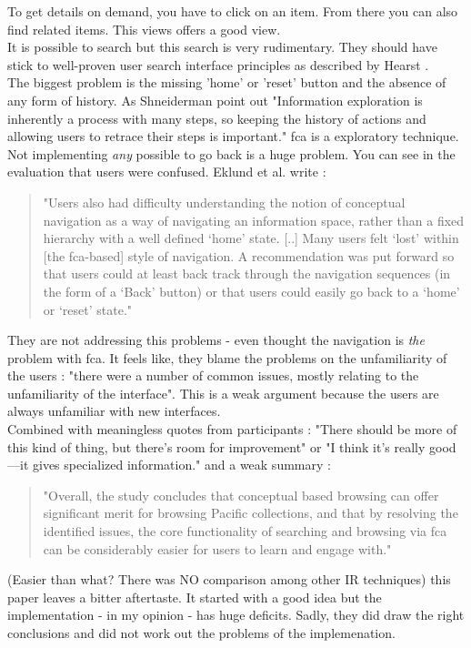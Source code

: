 \documentclass[11pt]{report}
\begin{document}
 To get details on demand, you have to click on an item. From there you can also find related items. This views offers a good view.\\
 
 It is possible to search but this search is very rudimentary. They should have stick to well-proven user search interface principles as described by Hearst \cite{Hearst2009}. \\
 
 The biggest problem is the missing 'home' or 'reset' button and the absence of any form of history. As Shneiderman \cite{Shneiderman1996} point out "Information exploration is inherently a process with many steps, so keeping the history of actions and allowing users to retrace their steps is important." \acrshort{fca} is a exploratory technique. Not implementing \textit{any} possible to go back is a huge problem. You can see in the evaluation that users were confused. Eklund et al. write \cite{Eklund2012}:
 \begin{quote}
 "Users also had difficulty understanding the notion of conceptual navigation as a way of navigating an information space, rather than a fixed hierarchy with a well defined ‘home’ state. [..] Many users felt ‘lost’ within [the \acrshort{fca}-based] style of navigation. A recommendation was put forward so that users could at least back track through the navigation sequences (in the form of a ‘Back’ button) or that users could easily go back to a ‘home’ or ‘reset’ state."
 \end{quote}
  They are not addressing this problems - even thought the navigation is \textit{the} problem with \acrshort{fca}. It feels like, they blame the problems on the unfamiliarity of the users \cite{Eklund2012}: "there were a number of common issues, mostly relating to the unfamiliarity of the interface". This is a weak argument because the users are always unfamiliar with new interfaces. \\
 
  Combined with meaningless quotes from participants \cite{Eklund2012}: "There should be more of this kind of thing, but there’s room for improvement" or "I think it’s really good—it gives specialized information." and a weak summary \cite{Eklund2012}:
  \begin{quote}
  "Overall, the study concludes that conceptual based browsing can offer significant merit for browsing Pacific collections, and that by resolving the identified issues, the core functionality of searching and browsing via \acrshort{fca} can be considerably easier for users to learn and engage with." 
  \end{quote}
  (Easier than what? There was NO comparison among other IR techniques) this paper leaves a bitter aftertaste. It started with a good idea but the implementation - in my opinion - has huge deficits. Sadly, they did draw the right conclusions and did not work out the problems of the implemenation.\\
 
\end{document}
